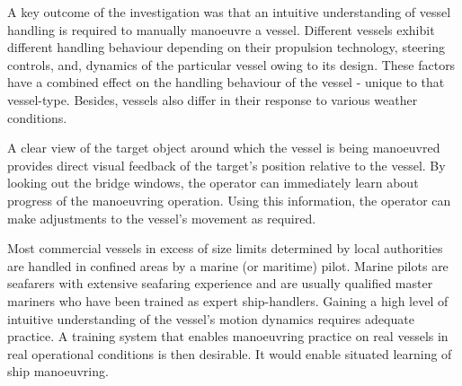 A key outcome of the investigation was that an intuitive understanding of vessel handling is required to manually manoeuvre a vessel. Different vessels exhibit different handling behaviour depending on their propulsion technology, steering controls, and, dynamics of the particular vessel owing to its design. These factors have a combined effect on the handling behaviour of the vessel - unique to that vessel-type. Besides, vessels also differ in their response to various weather conditions. 

A clear view of the target object around which the vessel is being manoeuvred provides direct visual feedback of the target’s position relative to the vessel. By looking out the bridge windows, the operator can immediately learn about progress of the manoeuvring operation. Using this information, the operator can make adjustments to the vessel's movement as required. 

Most commercial vessels in excess of size limits determined by local authorities are handled in confined areas by a marine (or maritime) pilot. Marine pilots are seafarers with extensive seafaring experience and are usually qualified master mariners who have been trained as expert ship-handlers. Gaining a high level of intuitive understanding of the vessel’s motion dynamics requires adequate practice. A training system that enables manoeuvring practice on real vessels in real operational conditions is then desirable. It would enable situated learning of ship manoeuvring. 





